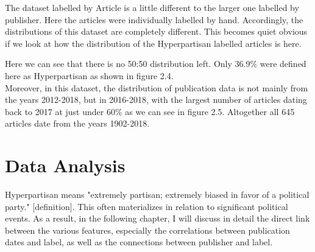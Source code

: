 \documentclass[11pt,titlepage,oneside,openany]{book}
\begin{document}
The dataset labelled by Article is a little different to the larger one labelled by publisher. Here the articles were individually labelled by hand. Accordingly, the distributions of this dataset are completely different. This becomes quiet obvious if we look at how the distribution of the Hyperpartisan labelled articles is here.
\begin{figure}[h]
\end{figure}
\noindent Here we can see that there is no 50:50 distribution left. Only 36.9\% were defined here as Hyperpartisan as shown in figure 2.4.\\
\noindent Moreover, in this dataset, the distribution of publication data is not mainly from the years 2012-2018, but in 2016-2018, with the largest number of articles dating back to 2017 at just under 60\% as we can see in figure 2.5. Altogether all 645 articles date from the years 1902-2018.

\section{Data Analysis}

Hyperpartisan means "extremely partisan; extremely biased in favor of a political party." [definition]. This often materializes in relation to significant political events. As a result, in the following chapter, I will discuss in detail the direct link between the various features, especially the correlations between publication dates and label, as well as the connections between publisher and label.\\
\begin{comment}
	\begin{figure}[h]
	\subfigure[Publisher with the highest amounts of Hyperpartisan Articles labelled by Article]{\texttt{[image: C:/Users/Laris/Documents/Bachelorarbeit/env/HyperpartisanNewsDetection/DataAnalysis/Url\_Article.png]}} 
	\subfigure[Publisher with the highest amounts of Hyperpartisan Articles labelled by Publisher]{\texttt{[image: C:/Users/Laris/Documents/Bachelorarbeit/env/HyperpartisanNewsDetection/DataAnalysis/Url\_Publisher.png]}} 
	\end{figure}
\end{comment}
\end{document}
